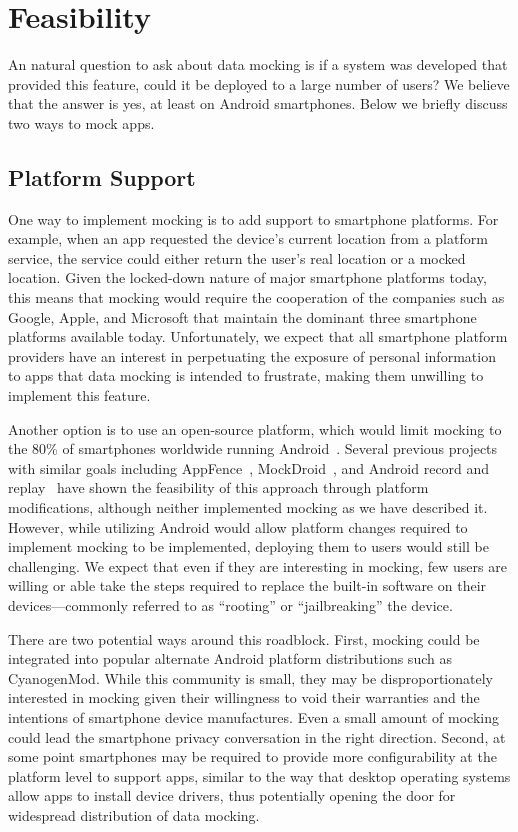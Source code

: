 \section{Feasibility}
\label{sec-feasibility}

An natural question to ask about data mocking is if a system was developed
that provided this feature, could it be deployed to a large number of users?
We believe that the answer is yes, at least on Android smartphones. Below we
briefly discuss two ways to mock apps.

\subsection{Platform Support}

One way to implement mocking is to add support to smartphone platforms. For
example, when an app requested the device's current location from a platform
service, the service could either return the user's real location or a mocked
location. Given the locked-down nature of major smartphone platforms today,
this means that mocking would require the cooperation of the companies such
as Google, Apple, and Microsoft that maintain the dominant three smartphone
platforms available today. Unfortunately, we expect that all smartphone
platform providers have an interest in perpetuating the exposure of personal
information to apps that data mocking is intended to frustrate, making them
unwilling to implement this feature.

Another option is to use an open-source platform, which would limit mocking
to the 80\% of smartphones worldwide running
Android~\cite{android-marketshare}. Several previous projects with similar
goals including AppFence~\cite{droids-ccs11},
MockDroid~\cite{mockdroid-hotmobile11}, and Android record and
replay~\cite{recordreplay-hotmobile11} have shown the feasibility of this
approach through platform modifications, although neither implemented mocking
as we have described it. However, while utilizing Android would allow
platform changes required to implement mocking to be implemented, deploying
them to users would still be challenging. We expect that even if they are
interesting in mocking, few users are willing or able take the steps required
to replace the built-in software on their devices---commonly referred to as
``rooting'' or ``jailbreaking'' the device. 

There are two potential ways around this roadblock. First, mocking could be
integrated into popular alternate Android platform distributions such as
CyanogenMod. While this community is small, they may be disproportionately
interested in mocking given their willingness to void their warranties and
the intentions of smartphone device manufactures. Even a small amount of
mocking could lead the smartphone privacy conversation in the right
direction. Second, at some point smartphones may be required to provide more
configurability at the platform level to support apps, similar to the way
that desktop operating systems allow apps to install device drivers, thus
potentially opening the door for widespread distribution of data mocking.

